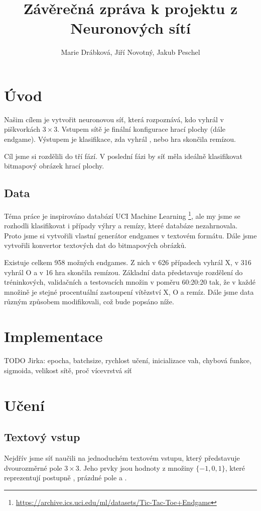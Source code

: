 \documentclass[10pt,a4paper]{article}
\title{Závěrečná zpráva k projektu z Neuronových sítí}
\author{Marie Drábková, Jiří Novotný, Jakub Peschel}
\begin{document}
\maketitle

\section*{Úvod}
Našim cílem je vytvořit neuronovou síť, která rozpoznává, kdo vyhrál v piškvorkách $3\times 3$. Vstupem sítě je finální konfigurace hrací plochy (dále endgame). Výstupem je klasifikace, zda vyhrál  ,  nebo hra skončila remízou. 

Cíl jsme si rozdělili do tří fází. V poslední fázi by síť měla ideálně klasifikovat bitmapový obrázek hrací plochy.


\subsection*{Data}
Téma práce je inspirováno databází UCI Machine Learning \footnote{\url{https://archive.ics.uci.edu/ml/datasets/Tic-Tac-Toe+Endgame}}, ale my jsme se rozhodli klasifikovat i případy výhry  a remízy, které databáze nezahrnovala. Proto jsme si vytvořili vlastní generátor endgames v textovém formátu. Dále jsme vytvořili konvertor textových dat do bitmapových obrázků.

Existuje celkem 958 možných endgames. Z nich v 626 případech vyhrál X, v 316 vyhrál O a v 16 hra skončila remízou. Základní data představuje rozdělení do tréninkových, validačních a testovacích množin v poměru 60:20:20 tak, že v každé množině je stejné procentuální zastoupení vítězství X, O a remíz. Dále jsme data různým způsobem modifikovali, což bude popsáno níže.

\section*{Implementace}
TODO Jirka: epocha, batchsize, rychlost učení, inicializace vah, chybová funkce, sigmoida, velikost sítě, proč vícevrstvá síť


\section*{Učení}
\subsection*{Textový vstup}
Nejdřív jsme síť naučili na jednoduchém textovém vstupu, který představuje dvourozměrné pole $3\times 3$. Jeho prvky jsou hodnoty z množiny $\{-1,0,1\}$, které reprezentují  postupně , prázdné pole a .
\end{document}
